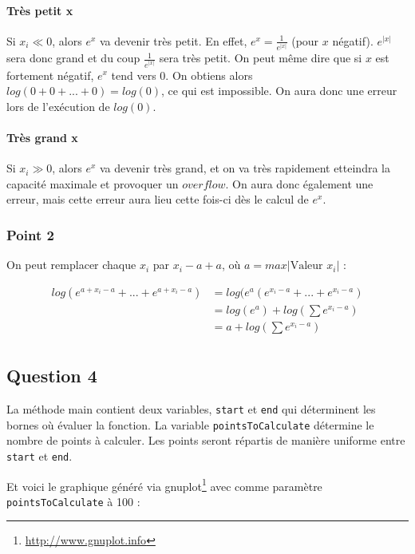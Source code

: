 \paragraph{Très petit x}
Si $x_i \ll 0$, alors $e^x$ va devenir très petit. En effet, $e^{x} = \frac{1}{e^{|x|}}$ (pour $x$ négatif). $e^{|x|}$ sera donc grand et du coup $\frac{1}{e^{|x|}}$ sera très petit. On peut même dire que si $x$ est fortement négatif, $e^x$ tend vers 0. On obtiens alors $log(0+0+...+0) = log(0)$, ce qui est impossible. On aura donc une erreur lors de l'exécution de $log(0)$.

\paragraph{Très grand x}
Si $x_i \gg 0$, alors $e^x$ va devenir très grand, et on va très rapidement etteindra la capacité maximale et provoquer un $overflow$. On aura donc également une erreur, mais cette erreur aura lieu cette fois-ci dès le calcul de $e^x$.

\subsubsection{Point 2}

On peut remplacer chaque $x_i$ par $x_i-a+a$, où $a = max|\text{Valeur }x_i|$ :

\begin{equation}
	\begin{aligned}
		log(e^{a+x_i-a}+...+e^{a+x_i-a}) &= log (e^a(e^{x_i-a}+...+e^{x_i-a})\\
		&= log (e^a)+log(\sum e^{x_i-a})\\
		&= a+log(\sum e^{x_i-a})\\
	\end{aligned}
\end{equation}

\subsection{Question 4}

La méthode main contient deux variables, \texttt{start} et \texttt{end} qui déterminent les bornes où évaluer la fonction. La variable \texttt{pointsToCalculate} détermine le nombre de points à calculer. Les points seront répartis de manière uniforme entre \texttt{start} et \texttt{end}.


Et voici le graphique généré via gnuplot\footnote{\url{http://www.gnuplot.info}} avec comme paramètre \texttt{pointsToCalculate} à 100 :

